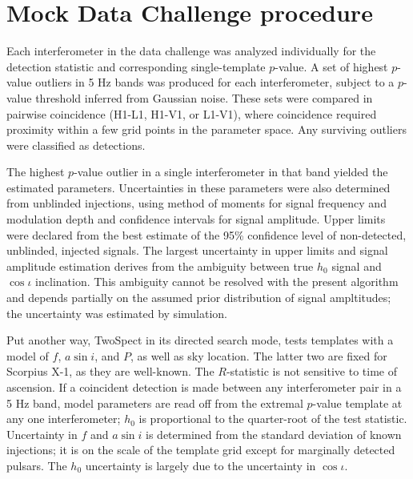 \section{Mock Data Challenge procedure}

Each interferometer in the data challenge was analyzed individually for 
the detection statistic and corresponding single-template $p$-value. A set
of highest $p$-value outliers in 5 Hz bands was produced for each 
interferometer, subject to a $p$-value threshold inferred from Gaussian noise.
These sets were compared in pairwise coincidence (H1-L1, H1-V1, or L1-V1),
where coincidence required proximity within a few grid points in the 
parameter space. Any surviving outliers were classified as detections. 

The highest $p$-value outlier in a single interferometer in that band 
yielded the estimated parameters. Uncertainties in these parameters were also
determined from unblinded injections, using method of moments for signal
frequency and modulation depth and confidence intervals for signal
amplitude. Upper limits were declared from the best estimate of the 95\%
 confidence level of non-detected, unblinded, injected signals. The
largest uncertainty in upper limits and signal amplitude estimation derives
from the ambiguity between true $h_0$ signal and $\cos \iota$ inclination.
This ambiguity cannot be resolved with the present algorithm and depends
partially on the assumed prior distribution of signal ampltitudes; the
uncertainty was estimated by simulation.

Put another way, TwoSpect
in its directed search mode, tests templates with a model of
$f$, $a \sin i$, and $P$, as well as sky location. The latter two are
fixed for Scorpius X-1, as they are well-known. 
The $R$-statistic is not sensitive to time of ascension.
If a coincident detection is made between any interferometer pair in a 5 Hz band,
model parameters are read off from the extremal $p$-value template at
any one interferometer; $h_0$ is proportional to the quarter-root of
the test statistic. Uncertainty in $f$ and $a \sin i$ is determined
from the standard deviation of known injections; it is on the scale
of the template grid except for marginally detected pulsars. The $h_0$ 
uncertainty is largely due to the uncertainty in $\cos \iota$. 


